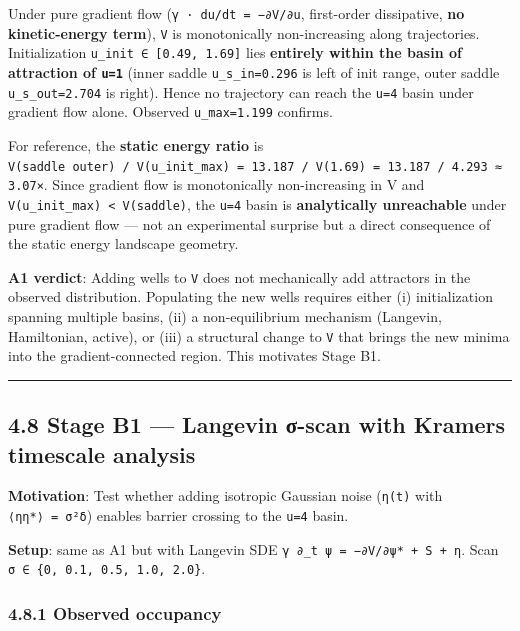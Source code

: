 \documentclass[
]{article}
\begin{document}
Under pure gradient flow (\texttt{γ\ ·\ du/dt\ =\ −∂V/∂u}, first-order
dissipative, \textbf{no kinetic-energy term}), \texttt{V} is
monotonically non-increasing along trajectories. Initialization
\texttt{u\_init\ ∈\ {[}0.49,\ 1.69{]}} lies \textbf{entirely within the
basin of attraction of \texttt{u=1}} (inner saddle
\texttt{u\_s\_in=0.296} is left of init range, outer saddle
\texttt{u\_s\_out=2.704} is right). Hence no trajectory can reach the
\texttt{u=4} basin under gradient flow alone. Observed
\texttt{u\_max=1.199} confirms.

For reference, the \textbf{static energy ratio} is
\texttt{V(saddle\ outer)\ /\ V(u\_init\_max)\ =\ 13.187\ /\ V(1.69)\ =\ 13.187\ /\ 4.293\ ≈\ 3.07×}.
Since gradient flow is monotonically non-increasing in V and
\texttt{V(u\_init\_max)\ \textless{}\ V(saddle)}, the \texttt{u=4} basin
is \textbf{analytically unreachable} under pure gradient flow --- not an
experimental surprise but a direct consequence of the static energy
landscape geometry.

\textbf{A1 verdict}: Adding wells to \texttt{V} does not mechanically
add attractors in the observed distribution. Populating the new wells
requires either (i) initialization spanning multiple basins, (ii) a
non-equilibrium mechanism (Langevin, Hamiltonian, active), or (iii) a
structural change to \texttt{V} that brings the new minima into the
gradient-connected region. This motivates Stage B1.

\begin{center}\rule{0.5\linewidth}{0.5pt}\end{center}

\hypertarget{stage-b1-langevin-ux3c3-scan-with-kramers-timescale-analysis}{%
\subsection{4.8 Stage B1 --- Langevin σ-scan with Kramers timescale
analysis}\label{stage-b1-langevin-ux3c3-scan-with-kramers-timescale-analysis}}

\textbf{Motivation}: Test whether adding isotropic Gaussian noise
(\texttt{η(t)} with \texttt{⟨ηη*⟩\ =\ σ²δ}) enables barrier crossing to
the \texttt{u=4} basin.

\textbf{Setup}: same as A1 but with Langevin SDE
\texttt{γ\ ∂\_t\ ψ\ =\ −∂V/∂ψ*\ +\ S\ +\ η}. Scan
\texttt{σ\ ∈\ \{0,\ 0.1,\ 0.5,\ 1.0,\ 2.0\}}.

\hypertarget{observed-occupancy}{%
\subsubsection{4.8.1 Observed occupancy}\label{observed-occupancy}}
\end{document}
